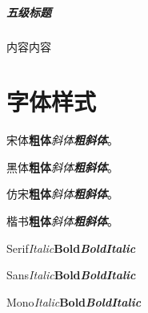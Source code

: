 \documentclass[type = bachelor]{whu-thesis}
\begin{document}
\subparagraph{五级标题}
内容内容

\section{字体样式}
宋体\quad \textbf{粗体}\quad \textit{斜体}\quad \textbf{\textit{粗斜体}}。

{\heiti 黑体\quad \textbf{粗体}\quad \textit{斜体}\quad \textbf{\textit{粗斜体}}}。

{\fangsong 仿宋\quad \textbf{粗体}\quad \textit{斜体}\quad \textbf{\textit{粗斜体}}}。

{\kaishu 楷书\quad \textbf{粗体}\quad \textit{斜体}\quad \textbf{\textit{粗斜体}}}。

Serif\quad \textit{Italic}\quad \textbf{Bold}\quad \textbf{\textit{BoldItalic}}

{\sffamily Sans\quad \textit{Italic}\quad \textbf{Bold}\quad \textbf{\textit{BoldItalic}}}

{\ttfamily Mono\quad \textit{Italic}\quad \textbf{Bold}\quad \textbf{\textit{BoldItalic}}}
\end{document}
